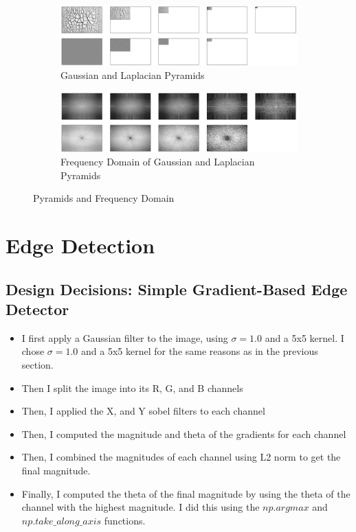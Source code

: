 \documentclass[12pt]{article}
\begin{document}
\begin{figure}[H]
    \centering
    \begin{subfigure}[b]{\textwidth}
        \centering
        \includegraphics[width=\textwidth]{images/Gaussian_Laplacian_Pyramid.png}
        \caption{Gaussian and Laplacian Pyramids}
        \label{fig:sub1}
    \end{subfigure}
    
    \begin{subfigure}[b]{\textwidth}
        \centering
        \includegraphics[width=\textwidth]{images/Gaussian_Laplacian_Frequency.png}
        \caption{Frequency Domain of Gaussian and Laplacian Pyramids}
        \label{fig:sub2}
    \end{subfigure}
    
    \caption{Pyramids and Frequency Domain}
    \label{fig:main}
\end{figure}


\section{Edge Detection}

\subsection{Design Decisions: Simple Gradient-Based Edge Detector}
\begin{itemize}
    \item I first apply a Gaussian filter to the image, using $\sigma = 1.0$ and a 5x5 kernel. I chose $\sigma = 1.0$ and a 5x5 kernel for the same reasons as in the previous section.
    \item Then I split the image into its R, G, and B channels
    \item Then, I applied the X, and Y sobel filters to each channel
    \item Then, I computed the magnitude and theta of the gradients for each channel
    \item Then, I combined the magnitudes of each channel using L2 norm to get the final magnitude.
    \item Finally, I computed the theta of the final magnitude by using the theta of the channel with the highest magnitude. I did this using the $np.argmax$ and $np.take\_along\_axis$ functions.
\end{itemize}
\end{document}
